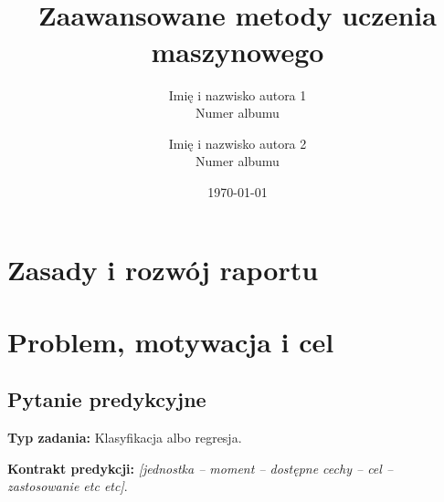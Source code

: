 \documentclass[10pt,twocolumn,a4paper]{article}
\title{\TematProjektu\\[2mm]
\large Zaawansowane metody uczenia maszynowego}
\author{Imię i nazwisko autora 1\\\small Numer albumu
\and Imię i nazwisko autora 2\\\small Numer albumu}
\date{\quad \today}
\newcommand{\TypZadania}{Klasyfikacja albo regresja}
\newif\ifwskazowki
\newcommand{\wskazowka}[1]{\ifwskazowki
  \par\begingroup\small\color{black!72}\raggedright#1\par\endgroup\fi}
\newcommand{\pole}[1]{\textit{[#1]}}
\begin{document}
\maketitle

\begin{abstract}
\wskazowka{W wersji końcowej: problem, dane, protokół oceny,
najważniejszy wynik liczbowy względem baseline i ograniczenie.
W R1 przedstaw cel i plan; zaznacz, że finalne wyniki jeszcze nie istnieją.
Streszczenie aktualizujemy po każdej iteracji, generalnie powinno tutaj być 
zachowane streszczenie na max pół strony o całości projektu}
\end{abstract}

\section*{Zasady i rozwój raportu}
\wskazowka{To jeden dokument rozwijany iteracyjnie. W kolejnych
wersjach poprawiamy również wcześniejsze części i wnioski jeśli będzie taka potrzeba.}


\wskazowka{Raport przygotowujemy w \LaTeX{} (lub jak ktoś nie lubi moze byc doc) i oddajemy jako PDF.
Jedna osoba przekazuje na Delcie raport oraz kod projektu w imieniu
zespołu. Można pracować wspólnie w Overleaf, ale wybór edytora jest dowolny.
Kod powinien mieć instrukcję uruchomienia i opis środowiska (Docker?)}

\wskazowka{Wskazówki, moje uwagi i pola w nawiasach zastępuje własna treść, proszę oczywiście pousuwać to co jest obecnie wypełnione. Szablon jest poglądowy, mogą Państwo zmieniać wedle uznania}

\section{Problem, motywacja i cel}
\subsection{Pytanie predykcyjne}
\wskazowka{Zdefiniuj jednostkę obserwacji, cel i moment predykcji:
dla jakiego obiektu, kiedy i na podstawie jakich dostępnych informacji
przewidujemy jaką wielkość? Jaki jest postawiony nasz cel "biznesowy" ?
Opisz zastosowanie i odbiorce projektu.}

\noindent\textbf{Typ zadania:} \TypZadania.

\noindent\textbf{Kontrakt predykcji:}
\pole{jednostka -- moment -- dostępne cechy -- cel -- zastosowanie etc etc}.
\end{document}
